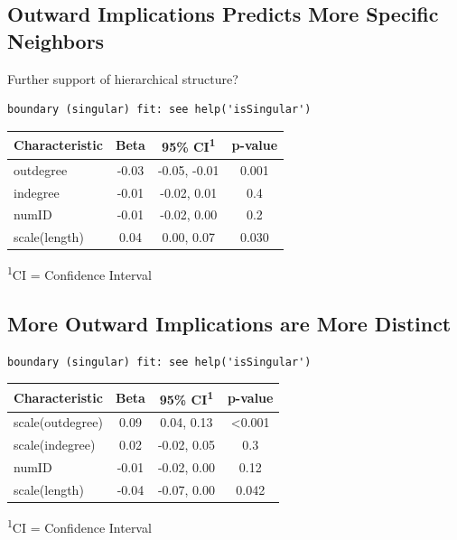 \documentclass[
  .7em,
  letterpaper,
  DIV=11,
  numbers=noendperiod]{scrartcl}
\begin{document}
\hypertarget{outward-implications-predicts-more-specific-neighbors}{%
\subsection{Outward Implications Predicts More Specific
Neighbors}\label{outward-implications-predicts-more-specific-neighbors}}

Further support of hierarchical structure?

\begin{verbatim}
boundary (singular) fit: see help('isSingular')
\end{verbatim}

\captionsetup[table]{labelformat=empty,skip=1pt}
\setlength{\LTpost}{0mm}
\begin{longtable}{lccc}
\toprule
\textbf{Characteristic} & \textbf{Beta} & \textbf{95\% CI}\textsuperscript{1} & \textbf{p-value} \\ 
\midrule
outdegree & -0.03 & -0.05, -0.01 & 0.001 \\ 
indegree & -0.01 & -0.02, 0.01 & 0.4 \\ 
numID & -0.01 & -0.02, 0.00 & 0.2 \\ 
scale(length) & 0.04 & 0.00, 0.07 & 0.030 \\ 
\bottomrule
\end{longtable}
\begin{minipage}{\linewidth}
\textsuperscript{1}CI = Confidence Interval\\
\end{minipage}

\hypertarget{more-outward-implications-are-more-distinct}{%
\subsection{More Outward Implications are More
Distinct}\label{more-outward-implications-are-more-distinct}}

\begin{verbatim}
boundary (singular) fit: see help('isSingular')
\end{verbatim}

\captionsetup[table]{labelformat=empty,skip=1pt}
\setlength{\LTpost}{0mm}
\begin{longtable}{lccc}
\toprule
\textbf{Characteristic} & \textbf{Beta} & \textbf{95\% CI}\textsuperscript{1} & \textbf{p-value} \\ 
\midrule
scale(outdegree) & 0.09 & 0.04, 0.13 & <0.001 \\ 
scale(indegree) & 0.02 & -0.02, 0.05 & 0.3 \\ 
numID & -0.01 & -0.02, 0.00 & 0.12 \\ 
scale(length) & -0.04 & -0.07, 0.00 & 0.042 \\ 
\bottomrule
\end{longtable}
\begin{minipage}{\linewidth}
\textsuperscript{1}CI = Confidence Interval\\
\end{minipage}
\end{document}
